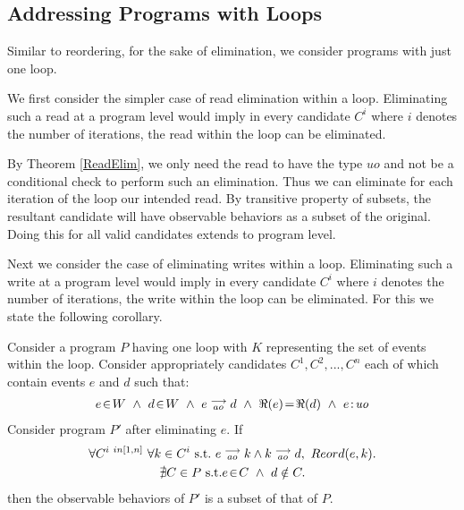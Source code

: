 \subsection{Addressing Programs with Loops}
    
        Similar to reordering, for the sake of elimination, we consider programs with just one loop. 
        
        We first consider the simpler case of read elimination within a loop. 
        Eliminating such a read at a program level would imply in every candidate $C^i$ where $i$ denotes the number of iterations, the read within the loop can be eliminated.
        
        By Theorem \ref{ReadElim}, we only need the read to have the type $uo$ and not be a conditional check to perform such an elimination.
        Thus we can eliminate for each iteration of the loop our intended read. 
        By transitive property of subsets, the resultant candidate will have observable behaviors as a subset of the original. 
        Doing this for all valid candidates extends to program level.

        Next we consider the case of eliminating writes within a loop. 
        Eliminating such a write at a program level would imply in every candidate $C^i$ where $i$ denotes the number of iterations, the write within the loop can be eliminated.
        For this we state the following corollary.
        \begin{corollary}
            Consider a program $P$ having one loop with $K$ representing the set of events within the loop. Consider appropriately candidates $C^1, C^2, ... , C^n$ each of which contain events $e$ and $d$ such that:
            \begin{align*}
                \event{e}{W} \ \wedge \ \event{d}{W} \ \wedge \ \reln{e}{ao}{d} \ \wedge \ \Re(e)\!=\!\Re(d) \ \wedge \ \et{e}{uo}
            \end{align*}
            Consider program $P'$ after eliminating $e$. 
            If
            \begin{gather*}
                  \forall C^{i \ in [1,n]} \ \forall k \in C^i \ \text{s.t.} \ \reln{e}{ao}{k} \wedge \reln{k}{ao}{d}, \ Reord(e,k). \\ 
                  \nexists C \in P \ \text{s.t.} \event{e}{C} \ \wedge \  d \notin C.
            \end{gather*}
            then the observable behaviors of $P'$ is a subset of that of $P$. 
        \end{corollary}

